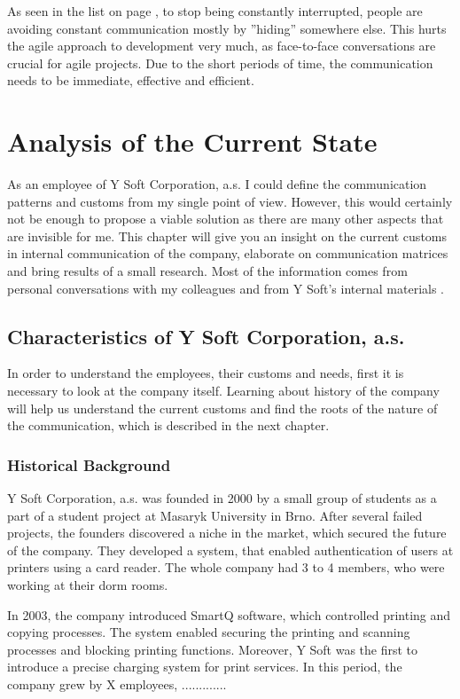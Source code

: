 \documentclass[11pt,singleside]{myfithesis2}
\begin{document}
As seen in the list on page \pageref{list:avoidingCommunication}, to stop being constantly interrupted, people are avoiding constant communication mostly by ''hiding'' somewhere else. This hurts the agile approach to development very much, as face-to-face conversations are crucial for agile projects. Due to the short periods of time, the communication needs to be immediate, effective and efficient.
	
	
\chapter{Analysis of the Current State}

As an employee of Y Soft Corporation, a.s. I could define the communication patterns and customs from my single point of view. However, this would certainly not be enough to propose a viable solution as there are many other aspects that are invisible for me. This chapter will give you an insight on the current customs in internal communication of the company, elaborate on communication matrices and bring results of a small research. Most of the information comes from personal conversations with my colleagues and from Y Soft's internal materials \cite{ysoftInternal}.

	\section{Characteristics of Y Soft Corporation, a.s.}
In order to understand the employees, their customs and needs, first it is necessary to look at the company itself. Learning about history of the company will help us understand the current customs and find the roots of the nature of the communication, which is described in the next chapter.

		\subsection{Historical Background}

Y Soft Corporation, a.s. was founded in 2000 by a small group of students as a part of a student project at Masaryk University in Brno. After several failed projects, the founders discovered a niche in the market, which secured the future of the company. They developed a system, that enabled authentication of users at printers using a card reader. The whole company had 3 to 4 members, who were working at their dorm rooms.

In 2003, the company introduced SmartQ software, which controlled printing and copying processes. The system enabled securing the printing and scanning processes and blocking printing functions. Moreover, Y Soft was the first to introduce a precise charging system for print services. In this period, the company grew by X employees, .............
\end{document}
